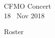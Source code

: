 \documentclass[letter,6pt,poets]{ConcProg}
\begin{document}
\begin{programme}{
    CFMO Concert
\\  {\normalsize 18 ~Nov 2018}
}
\begin{part}[]
%

  \end{part}
  
  
\end{programme}
\begin{center}
Roster
\end{center}
\end{document}
